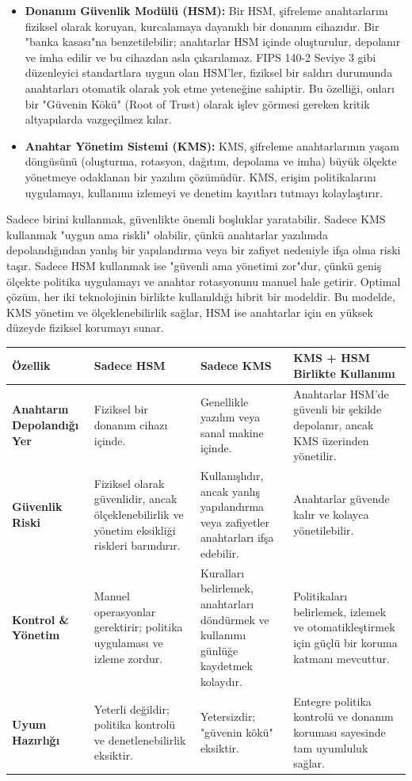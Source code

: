 \begin{itemize}
    \item \textbf{Donanım Güvenlik Modülü (HSM):} Bir HSM, şifreleme anahtarlarını fiziksel olarak koruyan, kurcalamaya dayanıklı bir donanım cihazıdır. Bir "banka kasası"na benzetilebilir; anahtarlar HSM içinde oluşturulur, depolanır ve imha edilir ve bu cihazdan asla çıkarılamaz. FIPS 140-2 Seviye 3 gibi düzenleyici standartlara uygun olan HSM'ler, fiziksel bir saldırı durumunda anahtarları otomatik olarak yok etme yeteneğine sahiptir. Bu özelliği, onları bir "Güvenin Kökü" (Root of Trust) olarak işlev görmesi gereken kritik altyapılarda vazgeçilmez kılar.
    \item \textbf{Anahtar Yönetim Sistemi (KMS):} KMS, şifreleme anahtarlarının yaşam döngüsünü (oluşturma, rotasyon, dağıtım, depolama ve imha) büyük ölçekte yönetmeye odaklanan bir yazılım çözümüdür. KMS, erişim politikalarını uygulamayı, kullanımı izlemeyi ve denetim kayıtları tutmayı kolaylaştırır.
\end{itemize}

Sadece birini kullanmak, güvenlikte önemli boşluklar yaratabilir. Sadece KMS kullanmak "uygun ama riskli" olabilir, çünkü anahtarlar yazılımda depolandığından yanlış bir yapılandırma veya bir zafiyet nedeniyle ifşa olma riski taşır. Sadece HSM kullanmak ise "güvenli ama yönetimi zor"dur, çünkü geniş ölçekte politika uygulamayı ve anahtar rotasyonunu manuel hale getirir. Optimal çözüm, her iki teknolojinin birlikte kullanıldığı hibrit bir modeldir. Bu modelde, KMS yönetim ve ölçeklenebilirlik sağlar, HSM ise anahtarlar için en yüksek düzeyde fiziksel korumayı sunar.

\begin{adjustbox}{max width=\textwidth}
\begin{tabularx}{\textwidth}{|Y|X|X|X|}
\hline
\textbf{Özellik} & \textbf{Sadece HSM} & \textbf{Sadece KMS} & \textbf{KMS + HSM Birlikte Kullanımı} \\ \hline
\textbf{Anahtarın Depolandığı Yer} & Fiziksel bir donanım cihazı içinde. & Genellikle yazılım veya sanal makine içinde. & Anahtarlar HSM'de güvenli bir şekilde depolanır, ancak KMS üzerinden yönetilir. \\ \hline
\textbf{Güvenlik Riski} & Fiziksel olarak güvenlidir, ancak ölçeklenebilirlik ve yönetim eksikliği riskleri barındırır. & Kullanışlıdır, ancak yanlış yapılandırma veya zafiyetler anahtarları ifşa edebilir. & Anahtarlar güvende kalır ve kolayca yönetilebilir. \\ \hline
\textbf{Kontrol \& Yönetim} & Manuel operasyonlar gerektirir; politika uygulaması ve izleme zordur. & Kuralları belirlemek, anahtarları döndürmek ve kullanımı günlüğe kaydetmek kolaydır. & Politikaları belirlemek, izlemek ve otomatikleştirmek için güçlü bir koruma katmanı mevcuttur. \\ \hline
\textbf{Uyum Hazırlığı} & Yeterli değildir; politika kontrolü ve denetlenebilirlik eksiktir. & Yetersizdir; "güvenin kökü" eksiktir. & Entegre politika kontrolü ve donanım koruması sayesinde tam uyumluluk sağlar. \\ \hline
\end{tabularx}
\end{adjustbox}

